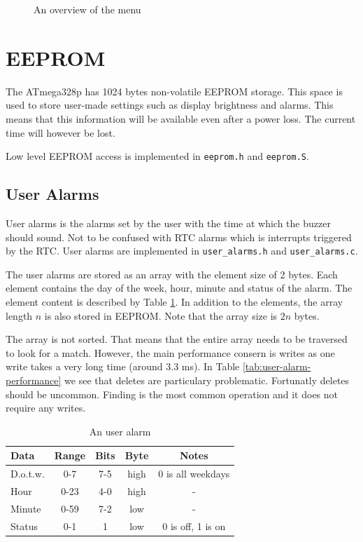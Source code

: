 \documentclass{awac02}
\begin{document}
\begin{figure}[h]
    \centering
    
    \label{fig:menu-flowchart}
    \caption{An overview of the menu}
\end{figure}

\section{EEPROM}

The ATmega328p has 1024 bytes non-volatile EEPROM storage. This space is used to
store user-made settings such as display brightness and alarms. This means that
this information will be available even after a power loss. The current time
will however be lost.

Low level EEPROM access is implemented in \texttt{eeprom.h} and
\texttt{eeprom.S}.

\subsection{User Alarms}
User alarms is the alarms set by the user with the time at which the buzzer
should sound. Not to be confused with RTC alarms which is interrupts triggered
by the RTC. User alarms are implemented
in \texttt{user\_alarms.h} and \texttt{user\_alarms.c}.

The user alarms are stored as an array with the element size of 2
bytes. Each element contains the day of the week, hour, minute and status of
the alarm. The element content is described by Table \ref{tab:user-alarm}.  In
addition to the elements, the array length $n$ is also stored in EEPROM. Note
that the array size is $2n$ bytes.

The array is not sorted. That means that the entire array needs to be traversed
to look for a match. However, the main performance consern is writes as one write
takes a very long time (around 3.3 ms). In Table
\ref{tab:user-alarm-performance} we see that deletes are particulary
problematic. Fortunatly deletes should be uncommon. Finding is the most common
operation and it does not require any writes.

\begin{table}[ht]
\centering
\begin{tabular}{| l | c | c | c | c |}
    \hline
    Data & Range & Bits & Byte & Notes\\
    \hline
    D.o.t.w. & 0-7 & 7-5 & high & 0 is all weekdays\\
    Hour & 0-23 & 4-0 & high & -\\
    Minute & 0-59 & 7-2 & low & -\\
    Status & 0-1 & 1 & low & 0 is off, 1 is on\\
    \hline
\end{tabular}
\caption{An user alarm}
\label{tab:user-alarm}
\end{table}
\end{document}
